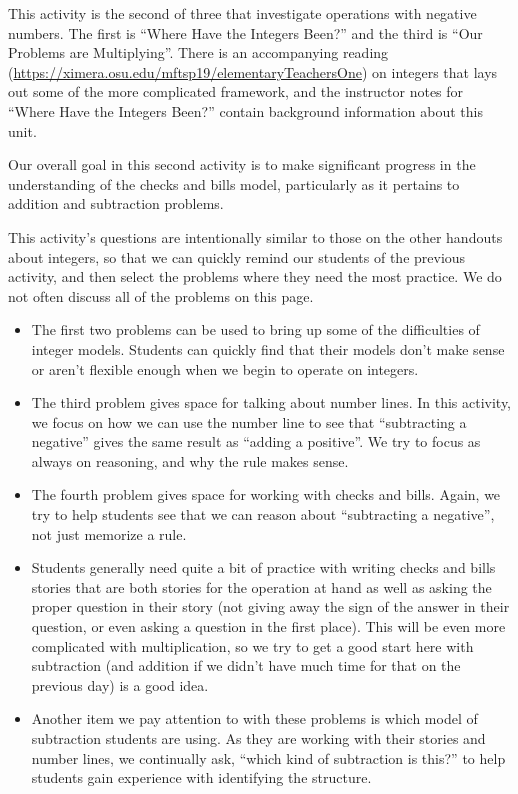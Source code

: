 \documentclass{ximera}
\begin{document}
\newpage
\begin{instructorNotes}
This activity is the second of three that investigate operations with negative numbers.  The first is ``Where Have the Integers Been?'' and the third is ``Our Problems are Multiplying''.  There is an accompanying reading (\url{https://ximera.osu.edu/mftsp19/elementaryTeachersOne}) on integers that lays out some of the more complicated framework, and the instructor notes for ``Where Have the Integers Been?'' contain background information about this unit.

Our overall goal in this second activity is to make significant progress in the understanding of the checks and bills model, particularly as it pertains to addition and subtraction problems.

This activity's questions are intentionally similar to those on the other handouts about integers, so that we can quickly remind our students of the previous activity, and then select the problems where they need the most practice.  We do not often discuss all of the problems on this page.

\begin{itemize}
    \item The first two problems can be used to bring up some of the difficulties of integer models.  Students can quickly find that their models don't make sense or aren't flexible enough when we begin to operate on integers.
    \item The third problem gives space for talking about number lines.  In this activity, we focus on how we can use the number line to see that ``subtracting a negative'' gives the same result as ``adding a positive''.  We try to focus as always on reasoning, and why the rule makes sense.
    \item The fourth problem gives space for working with checks and bills.  Again, we try to help students see that we can reason about ``subtracting a negative'', not just memorize a rule.
    \item Students generally need quite a bit of practice with writing checks and bills stories that are both stories for the operation at hand as well as asking the proper question in their story (not giving away the sign of the answer in their question, or even asking a question in the first place).  This will be even more complicated with multiplication, so we try to get a good start here with subtraction (and addition if we didn't have much time for that on the previous day) is a good idea.
    \item Another item we pay attention to with these problems is which model of subtraction students are using.  As they are working with their stories and number lines, we continually ask, ``which kind of subtraction is this?'' to help students gain experience with identifying the structure.
\end{itemize}



\end{instructorNotes}
\end{document}
